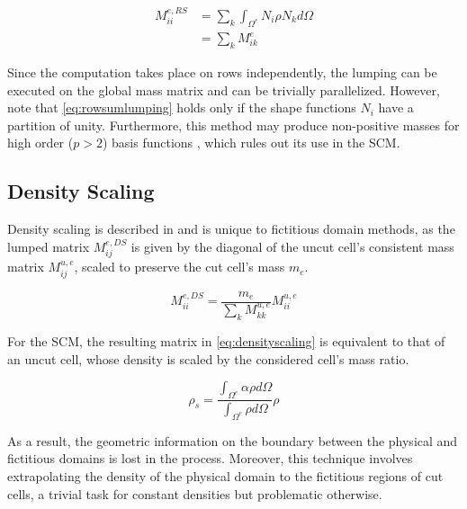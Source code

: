 \begin{equation} \label{eq:rowsumlumping}
	\begin{array}{rl}
	M_{ii}^{e,RS}
	
	&= \sum_k \int_{\Omega^e} N_i \rho N_k d\Omega \\[0.5em]
	&= \sum_k M_{ik}^e
		
	\end{array}
\end{equation}

Since the computation takes place on rows independently, the lumping can be executed
on the global mass matrix and can be trivially parallelized. However, note that
\ref{eq:rowsumlumping} holds only if the shape functions $N_i$ have a partition
of unity. Furthermore, this method may produce non-positive masses for high order ($p>2$)
basis functions \cite{Duczek2014}, which rules out its use in the SCM.

%
\subsection{Density Scaling}
\label{subsection:density_scaling_lumping}
%

Density scaling is described in \cite{Joulaian2014} and is unique to fictitious
domain methods, as the lumped matrix $M_{ij}^{e,DS}$ is given by the diagonal of the uncut cell's
consistent mass matrix $M_{ij}^{u,e}$, scaled to preserve the cut cell's mass $m_e$.

\begin{equation} \label{eq:densityscaling}
	M_{ii}^{e,DS} =
		\frac{m_e}{\sum_k M_{kk}^{u,e}} M_{ii}^{u,e}
\end{equation}

For the SCM, the resulting matrix in \ref{eq:densityscaling} is equivalent
to that of an uncut cell, whose density is scaled by the considered cell's mass ratio.

\begin{equation} \label{eq:scaleddensity}
	\rho_s = \frac{\int_{\Omega^e} \alpha \rho d\Omega}{\int_{\Omega^e} \rho d\Omega} \rho
\end{equation}

As a result, the geometric information on the boundary between the physical
and fictitious domains is lost in the process. Moreover, this technique involves extrapolating the density of the physical domain to the fictitious regions of cut cells, a trivial task for constant densities but problematic otherwise.

